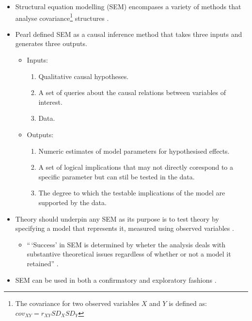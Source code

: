 \documentclass[
]{book}
\providecommand{\tightlist}{%
  \setlength{\itemsep}{0pt}\setlength{\parskip}{0pt}}
\begin{document}
\begin{itemize}
\item
  Structural equation modelling (SEM) encompases a variety of methods that analyse covariance\footnote{The covariance for two observed variables \(X\) and \(Y\) is defined as: \(cov_{XY} = r_{XY}SD_{X}SD_{Y}\)} structures \citep{Kline2016}.
\item
  Pearl \citeyearpar{Pearl2012} defined SEM as a causal inference method that takes three inputs and generates three outputs.

  \begin{itemize}
  \tightlist
  \item
    Inputs:

    \begin{enumerate}
    \def\labelenumi{(\alph{enumi})}
    \tightlist
    \item
      Qualitative causal hypotheses.
    \item
      A set of queries about the causal relations between variables of interest.
    \item
      Data.
    \end{enumerate}
  \item
    Outputs:

    \begin{enumerate}
    \def\labelenumi{(\alph{enumi})}
    \tightlist
    \item
      Numeric estimates of model parameters for hypothesised effects.
    \item
      A set of logical implications that may not directly corespond to a specific parameter but can stil be tested in the data.
    \item
      The degree to which the testable implications of the model are supported by the data.
    \end{enumerate}
  \end{itemize}
\item
  Theory should underpin any SEM as its purpose is to test theory by specifying a model that represents it, measured using observed variables \citep{Hayduk2007}.

  \begin{itemize}
  \tightlist
  \item
    ``\,`Success' in SEM is determined by wheter the analysis deals with substantive theoretical issues regardless of whether or not a model it retained'' \citep[ pp 9-10]{Kline2016}.
  \end{itemize}
\item
  SEM can be used in both a confirmatory and exploratory fashions \citep{Joreskog1993}.


\end{itemize}
\end{document}
